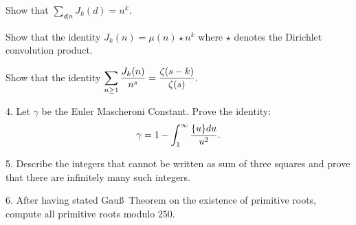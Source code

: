  Show that $\displaystyle\sum_{d | n } J_k(d) = n^k.$\vv

 Show that the identity $J_k(n) = \mu(n) \star n^k$ where $\star$ denotes the Dirichlet convolution product.\vv

 Show that the identity $\displaystyle\sum_{n\ge 1}{J_k(n)\over n^s} = {\zeta(s-k)\over\zeta(s)}.$\ve\vs

\item{4.} Let $\gamma$ be the Euler Mascheroni Constant. Prove the identity: 
$$\gamma=1-\int_{1}^\infty{\{u\}du\over u^2}.$$\vv

\item{5.} Describe the integers that cannot be written as sum of three squares and prove that there are infinitely many
such integers.\ve \vs

\item{6.} After having stated Gau\ss\ Theorem on the existence of primitive roots, compute all primitive roots modulo $250$.
\ \vst\bye
